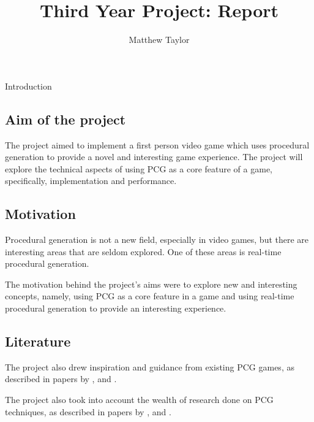 \documentclass[progress]{cmpreport}
\title{Third Year Project: Report}
\author{Matthew Taylor}
\begin{document}
\maketitle

\begin{section}{Introduction}

\subsection{Aim of the project}
The project aimed to implement a first person video game which uses procedural generation to provide a novel and interesting game experience. The project will explore the technical aspects of using PCG as a core feature of a game, specifically, implementation and performance. 

\subsection{Motivation}
Procedural generation is not a new field, especially in video games, but there are interesting areas that are seldom explored. One of these areas is real-time procedural generation.

The motivation behind the project's aims were to explore new and interesting concepts, namely, using PCG as a core feature in a game and using real-time procedural generation to provide an interesting experience.

\subsection{Literature}
The project also drew inspiration and guidance from existing PCG games, as described in papers by \citet{spufford_2003}, \cite{welsh_2016} and \cite{gct-spelunky}.

The project also took into account the wealth of research done on PCG techniques, as described in papers by \cite{Perlin:1985:IS:325165.325247}, \cite{ebert2003texturing} and \cite{Dormans:2010:ALD:1814256.1814257}.
   
\end{section}
\end{document}
